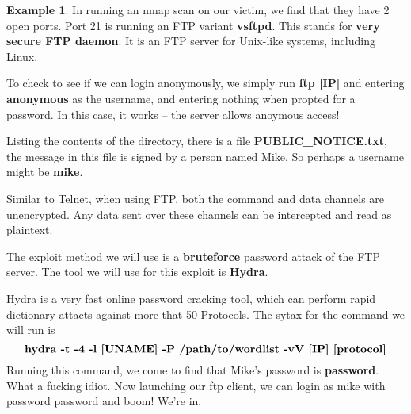 \documentclass[12pt]{article}
\theoremstyle{definition}
\theoremstyle{definition}
\newtheorem{exmp}{Example}[section]
\begin{document}
        \begin{exmp}
            In running an nmap scan on our victim, we find that they
            have 2 open ports. Port 21 is running an FTP variant \textbf{vsftpd}.
            This stands for \textbf{very secure FTP daemon}. It is an FTP server
            for Unix-like systems, including Linux.\par To check to see if we can
            login anonymously, we simply run \textbf{ftp [IP]} and entering
            \textbf{anonymous} as the username, and entering nothing when propted
            for a password. In this case, it works -- the server allows anoymous
            access! \par Listing the contents of the directory, there is a file
            \textbf{PUBLIC\_NOTICE.txt}, the message in this file is signed by
            a person named Mike. So perhaps a username might be \textbf{mike}.\par
            Similar to Telnet, when using FTP, both the command and data channels
            are unencrypted. Any data sent over these channels can be intercepted
            and read as plaintext.\par The exploit method we will use is
            a \textbf{bruteforce} password attack of the FTP server. The tool we
            will use for this exploit is \textbf{Hydra}. \par Hydra is a very fast
            online password cracking tool, which can perform rapid dictionary
            attacts against more that 50 Protocols. The sytax for the command we
            will run is 
            \begin{equation*}
                \text{\textbf{hydra -t -4 -l [UNAME] -P /path/to/wordlist -vV [IP]
                [protocol]}}
            \end{equation*}
            Running this command, we come to find that Mike's password is
            \textbf{password}. What a fucking idiot. Now launching our ftp client,
            we can login as mike with password password and boom! We're in.
        \end{exmp}
\end{document}
